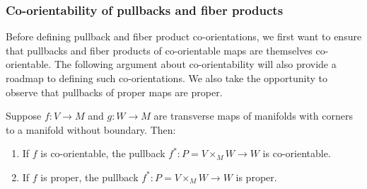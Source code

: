\begin{comment}
	BCOMMENT
	\red{Again, isn't the point that we do not know $\gamma$, so how can we fix the diagram to commute and then use that to determine $\gamma$? I think the idea is that we really need to say that the first diagram somehow determines this diagram via some conventions (what are those?).
		Then we know what the maps on the right are because that's just the tensor product of co-orientations of $V$ and $W$.
		On the left we know $i$ since that's canonical somehow (we still need to look up a good reference for that), and then all these other things determine a unique $\gamma$ so that the diagram commutes.
		This $\gamma$ is our co-orientation for $P$.
		So I think this all needs to be clarified.}
	Any such set of choices then yields
	a definition of pullback co-orientation through a diagram chase.
	In concrete terms, fix a local orientation $\beta_M$ of $M$, and then
	use the co-orientations of $f$ and $g$ to identify compatible local orientations $\beta_V$ of $V$ and $\beta_W$ of $W$.
	A fixed identification
	of the normal bundle of $\Delta M$ with the tangent bundle of $M$ then gives a $\beta_{\nu P \subset V \times W}$ which corresponds to $\beta_M$.
	The pullback co-orientation of the map $P \to M$ can then be defined pair $\beta_M$ with a
	local orientation $\beta_P$ of $P$ so that $\beta_P \otimes \beta_{\nu P \subset V \times W}$ maps to $\beta_V \otimes \beta_W$ under
	the top horizontal isomorphism of Equation~\ref{co-or stuff}.
	ECOMMENT

	In order to obtain these properties we will develop additional structure to control the
	isomorphisms in Diagram~\eqref{co-or stuff}.
	We do this first by working at the level of vector spaces and linear maps over a point before expanding to local definitions and then
	back to the global level.
\end{comment}

\subsubsection{Co-orientability of pullbacks and fiber products}

Before defining pullback and fiber product co-orientations, we first want to ensure that pullbacks and fiber products of co-orientable maps are themselves co-orientable.
The following argument about co-orientability will also provide a roadmap to defining such co-orientations.
We also take the opportunity to observe that pullbacks of proper maps are proper.

\begin{lemma}\label{L: co-orientable pullback}
	Suppose $f \colon V \to M$ and $g \colon W \to M$ are transverse maps of manifolds with corners to a manifold without boundary.
	Then:
	\begin{enumerate}
		\item If $f$ is co-orientable, the pullback $f^* \colon P = V \times_M W \to W$ is co-orientable.
		\item If $f$ is proper, the pullback $f^* \colon P = V \times_M W \to W$ is proper.
	\end{enumerate}
\end{lemma}

